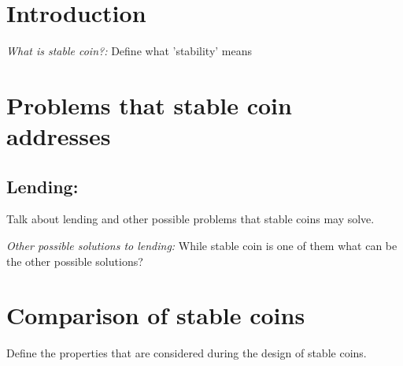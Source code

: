 \section{Introduction}
\textit{What is stable coin?:}
Define what 'stability' means

\section{Problems that stable coin addresses}

\subsection{Lending:}
Talk about lending and other possible problems that stable coins may solve.

\textit{Other possible solutions to lending:} While stable coin is one of them what can be the other possible solutions?

\section{Comparison of stable coins}
Define the properties that are considered during the design of stable coins. 



